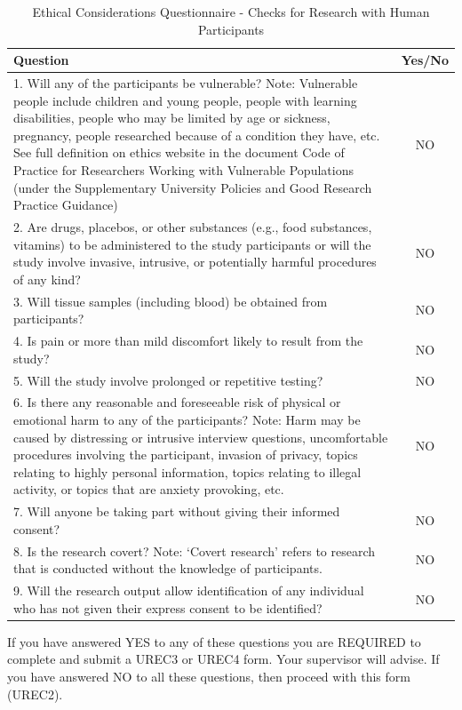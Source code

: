 \documentclass{article}
\begin{document}
\begin{table}
\centering
\begin{tabular}{|p{10cm}|c|}
\hline
Question & Yes/No \\
\hline
1. Will any of the participants be vulnerable? Note: Vulnerable people include children and young people, people with learning disabilities, people who may be limited by age or sickness, pregnancy, people researched because of a condition they have, etc. See full definition on ethics website in the document Code of Practice for Researchers Working with Vulnerable Populations (under the Supplementary University Policies and Good Research Practice Guidance) & NO \\
2. Are drugs, placebos, or other substances (e.g., food substances, vitamins) to be administered to the study participants or will the study involve invasive, intrusive, or potentially harmful procedures of any kind? & NO \\
3. Will tissue samples (including blood) be obtained from participants? & NO \\
4. Is pain or more than mild discomfort likely to result from the study? & NO \\
5. Will the study involve prolonged or repetitive testing? & NO \\
6. Is there any reasonable and foreseeable risk of physical or emotional harm to any of the participants? Note: Harm may be caused by distressing or intrusive interview questions, uncomfortable procedures involving the participant, invasion of privacy, topics relating to highly personal information, topics relating to illegal activity, or topics that are anxiety provoking, etc. & NO \\
7. Will anyone be taking part without giving their informed consent? & NO \\
8. Is the research covert? Note: ‘Covert research’ refers to research that is conducted without the knowledge of participants. & NO \\
9. Will the research output allow identification of any individual who has not given their express consent to be identified? & NO \\
\hline
\end{tabular}
\caption{Ethical Considerations Questionnaire - Checks for Research with Human Participants}
\end{table}

If you have answered YES to any of these questions you are REQUIRED to complete and submit a UREC3 or UREC4 form. Your supervisor will advise. If you have answered NO to all these questions, then proceed with this form (UREC2).
\end{document}
